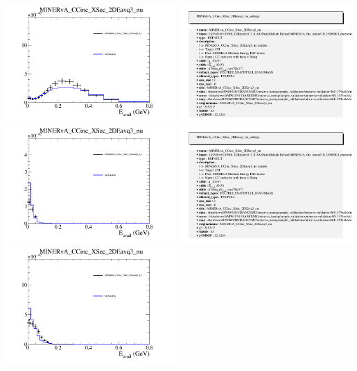 \documentclass{article}
\begin{document}
\centering
\includegraphics[width=0.49\textwidth]{figures/nuisance_MINERvA_CCinc_XSec_2DEavq3_nu_slice_5_comp.png}
\includegraphics[width=0.49\textwidth]{figures/nuisance_MINERvA_CCinc_XSec_2DEavq3_nu_info.png}
\centering
\includegraphics[width=0.49\textwidth]{figures/nuisance_MINERvA_CCinc_XSec_2DEavq3_nu_slice_0_comp.png}
\includegraphics[width=0.49\textwidth]{figures/nuisance_MINERvA_CCinc_XSec_2DEavq3_nu_info.png}
\centering
\includegraphics[width=0.49\textwidth]{figures/nuisance_MINERvA_CCinc_XSec_2DEavq3_nu_slice_1_comp.png}
\end{document}
